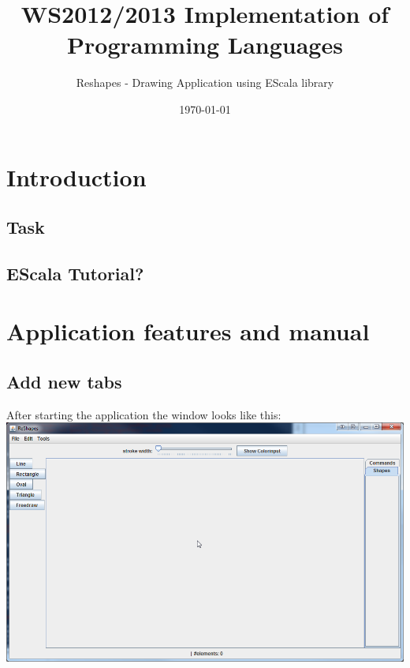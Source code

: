 \documentclass[12pt, accentcolor=tud9c, linedtoc, bigchapter, colorback, noresetcounter, numbersubsubsec]{tudreport}
\date{\today}
\title{WS2012/2013 Implementation of Programming Languages}
\subtitle{Reshapes - Drawing Application using EScala library}
\begin{document}
\maketitle
\tableofcontents

\chapter{Introduction}

\section{Task}

\section{EScala Tutorial?}

\chapter{Application features and manual}

\section{Add new tabs}

After starting the application the window looks like this: \\
\includegraphics[width=1\textwidth]{img/startup_window} \\
\end{document}
